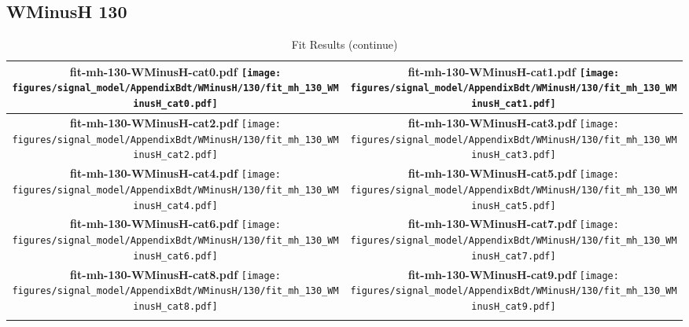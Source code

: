 \subsection{WMinusH 130}
\begin{longtable}{|c|c|}
\caption{Fit Results}
\endfirsthead
\caption{Fit Results (continue)}
\endhead
\hline
\parbox{0.47\textwidth}{
\centering
{\bfseries fit-mh-130-WMinusH-cat0.pdf}
\texttt{[image: figures/signal\_model/AppendixBdt/WMinusH/130/fit\_mh\_130\_WMinusH\_cat0.pdf]}
}
 & \parbox{0.47\textwidth}{
\centering
{\bfseries fit-mh-130-WMinusH-cat1.pdf}
\texttt{[image: figures/signal\_model/AppendixBdt/WMinusH/130/fit\_mh\_130\_WMinusH\_cat1.pdf]}
}
 \\
\hline
\parbox{0.47\textwidth}{
\centering
{\bfseries fit-mh-130-WMinusH-cat2.pdf}
\texttt{[image: figures/signal\_model/AppendixBdt/WMinusH/130/fit\_mh\_130\_WMinusH\_cat2.pdf]}
}
 & \parbox{0.47\textwidth}{
\centering
{\bfseries fit-mh-130-WMinusH-cat3.pdf}
\texttt{[image: figures/signal\_model/AppendixBdt/WMinusH/130/fit\_mh\_130\_WMinusH\_cat3.pdf]}
}
 \\
\hline
\parbox{0.47\textwidth}{
\centering
{\bfseries fit-mh-130-WMinusH-cat4.pdf}
\texttt{[image: figures/signal\_model/AppendixBdt/WMinusH/130/fit\_mh\_130\_WMinusH\_cat4.pdf]}
}
 & \parbox{0.47\textwidth}{
\centering
{\bfseries fit-mh-130-WMinusH-cat5.pdf}
\texttt{[image: figures/signal\_model/AppendixBdt/WMinusH/130/fit\_mh\_130\_WMinusH\_cat5.pdf]}
}
 \\
\hline
\parbox{0.47\textwidth}{
\centering
{\bfseries fit-mh-130-WMinusH-cat6.pdf}
\texttt{[image: figures/signal\_model/AppendixBdt/WMinusH/130/fit\_mh\_130\_WMinusH\_cat6.pdf]}
}
 & \parbox{0.47\textwidth}{
\centering
{\bfseries fit-mh-130-WMinusH-cat7.pdf}
\texttt{[image: figures/signal\_model/AppendixBdt/WMinusH/130/fit\_mh\_130\_WMinusH\_cat7.pdf]}
}
 \\
\hline
\parbox{0.47\textwidth}{
\centering
{\bfseries fit-mh-130-WMinusH-cat8.pdf}
\texttt{[image: figures/signal\_model/AppendixBdt/WMinusH/130/fit\_mh\_130\_WMinusH\_cat8.pdf]}
}
 & \parbox{0.47\textwidth}{
\centering
{\bfseries fit-mh-130-WMinusH-cat9.pdf}
\texttt{[image: figures/signal\_model/AppendixBdt/WMinusH/130/fit\_mh\_130\_WMinusH\_cat9.pdf]}
}
 \\
\hline
\parbox{0.47\textwidth}{
\centering
}
\end{longtable}
